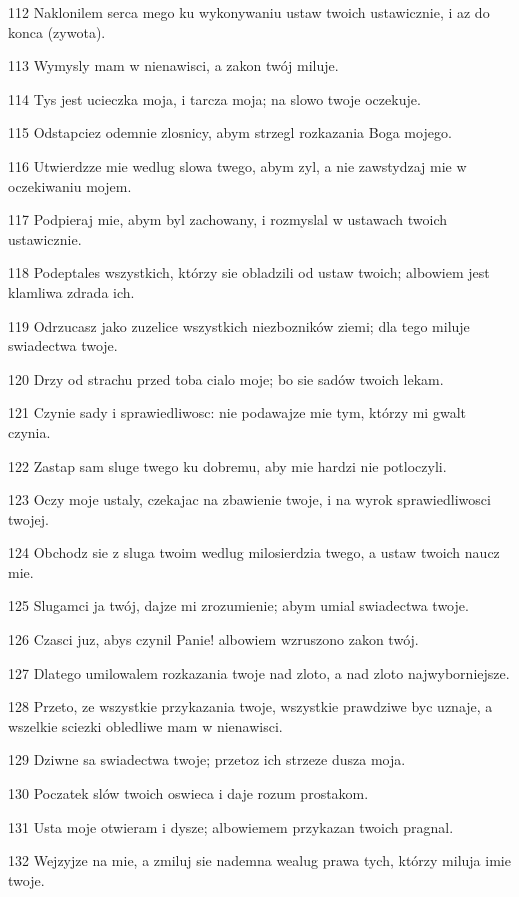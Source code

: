 \par 112 Naklonilem serca mego ku wykonywaniu ustaw twoich ustawicznie, i az do konca (zywota).
\par 113 Wymysly mam w nienawisci, a zakon twój miluje.
\par 114 Tys jest ucieczka moja, i tarcza moja; na slowo twoje oczekuje.
\par 115 Odstapciez odemnie zlosnicy, abym strzegl rozkazania Boga mojego.
\par 116 Utwierdzze mie wedlug slowa twego, abym zyl, a nie zawstydzaj mie w oczekiwaniu mojem.
\par 117 Podpieraj mie, abym byl zachowany, i rozmyslal w ustawach twoich ustawicznie.
\par 118 Podeptales wszystkich, którzy sie obladzili od ustaw twoich; albowiem jest klamliwa zdrada ich.
\par 119 Odrzucasz jako zuzelice wszystkich niezbozników ziemi; dla tego miluje swiadectwa twoje.
\par 120 Drzy od strachu przed toba cialo moje; bo sie sadów twoich lekam.
\par 121 Czynie sady i sprawiedliwosc: nie podawajze mie tym, którzy mi gwalt czynia.
\par 122 Zastap sam sluge twego ku dobremu, aby mie hardzi nie potloczyli.
\par 123 Oczy moje ustaly, czekajac na zbawienie twoje, i na wyrok sprawiedliwosci twojej.
\par 124 Obchodz sie z sluga twoim wedlug milosierdzia twego, a ustaw twoich naucz mie.
\par 125 Slugamci ja twój, dajze mi zrozumienie; abym umial swiadectwa twoje.
\par 126 Czasci juz, abys czynil Panie! albowiem wzruszono zakon twój.
\par 127 Dlatego umilowalem rozkazania twoje nad zloto, a nad zloto najwyborniejsze.
\par 128 Przeto, ze wszystkie przykazania twoje, wszystkie prawdziwe byc uznaje, a wszelkie sciezki obledliwe mam w nienawisci.
\par 129 Dziwne sa swiadectwa twoje; przetoz ich strzeze dusza moja.
\par 130 Poczatek slów twoich oswieca i daje rozum prostakom.
\par 131 Usta moje otwieram i dysze; albowiemem przykazan twoich pragnal.
\par 132 Wejzyjze na mie, a zmiluj sie nademna wealug prawa tych, którzy miluja imie twoje.
